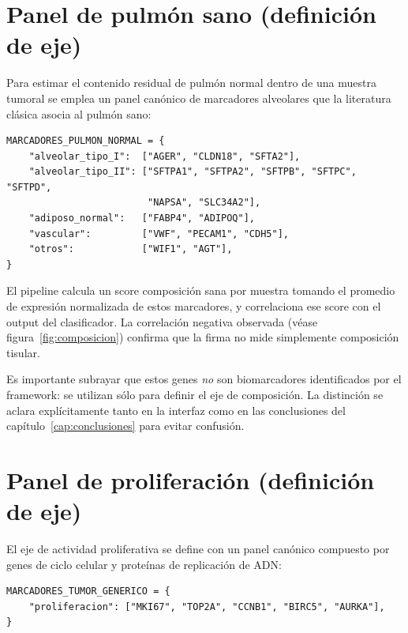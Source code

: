 \section*{Panel de pulmón sano (definición de eje)}
{}

Para estimar el contenido residual de pulmón normal dentro de una
muestra tumoral se emplea un panel canónico de marcadores alveolares
que la literatura clásica asocia al pulmón sano:

\begin{lstlisting}[style=python, caption={Panel de marcadores de pulmón sano.}]
MARCADORES_PULMON_NORMAL = {
    "alveolar_tipo_I":  ["AGER", "CLDN18", "SFTA2"],
    "alveolar_tipo_II": ["SFTPA1", "SFTPA2", "SFTPB", "SFTPC", "SFTPD",
                         "NAPSA", "SLC34A2"],
    "adiposo_normal":   ["FABP4", "ADIPOQ"],
    "vascular":         ["VWF", "PECAM1", "CDH5"],
    "otros":            ["WIF1", "AGT"],
}
\end{lstlisting}

El pipeline calcula un score composición sana por muestra tomando el
promedio de expresión normalizada de estos marcadores, y correlaciona
ese score con el output del clasificador. La correlación negativa
observada (véase figura~\ref{fig:composicion}) confirma que la firma no
mide simplemente composición tisular.

Es importante subrayar que estos genes \emph{no} son biomarcadores
identificados por el framework: se utilizan sólo para definir el eje de
composición. La distinción se aclara explícitamente tanto en la
interfaz como en las conclusiones del capítulo~\ref{cap:conclusiones}
para evitar confusión.

\section*{Panel de proliferación (definición de eje)}
{}

El eje de actividad proliferativa se define con un panel canónico
compuesto por genes de ciclo celular y proteínas de replicación de ADN:

\begin{lstlisting}[style=python, caption={Panel de proliferación.}]
MARCADORES_TUMOR_GENERICO = {
    "proliferacion": ["MKI67", "TOP2A", "CCNB1", "BIRC5", "AURKA"],
}
\end{lstlisting}

